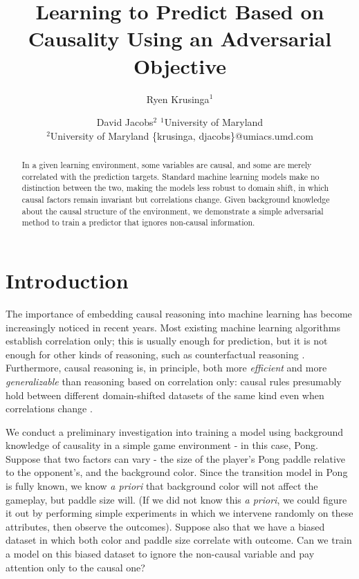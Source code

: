 \documentclass{article}
\title{Learning to Predict Based on Causality Using an Adversarial Objective}
\author{
Ryen Krusinga$^1$
\and
David Jacobs$^2$
\affiliations
$^1$University of Maryland\\
$^2$University of Maryland
\emails
\{krusinga, djacobs\}@umiacs.umd.com
}
\begin{document}
\maketitle

\begin{abstract}
In a given learning environment, some variables are causal, and some are merely correlated with the prediction targets. Standard machine learning models make no distinction between the two, making the models less robust to domain shift, in which causal factors remain invariant but correlations change. Given background knowledge about the causal structure of the environment, we demonstrate a simple adversarial method to train a predictor that ignores non-causal information. %
\end{abstract}


\section{Introduction}
The importance of embedding causal reasoning into machine learning has become increasingly noticed in recent years. Most existing machine learning algorithms establish correlation only; this is usually enough for prediction, but it is not enough for other kinds of reasoning, such as counterfactual reasoning \cite{pearl2018theoretical} \cite{Pearl2009}. Furthermore, causal reasoning is, in principle, both more \emph{efficient} and more \emph{generalizable} than reasoning based on correlation only: causal rules presumably hold between different domain-shifted datasets of the same kind even when correlations change \cite{Bottou2019presentation}. 

We conduct a preliminary investigation into training a model using background knowledge of causality in a simple game environment - in this case, Pong. Suppose that two factors can vary - the size of the player's Pong paddle relative to the opponent's, and the background color. Since the transition model in Pong is fully known, we know \emph{a priori} that background color will not affect the gameplay, but paddle size will. (If we did not know this \emph{a priori}, we could figure it out by performing simple experiments in which we intervene randomly on these attributes, then observe the outcomes). Suppose also that we have a biased dataset in which both color and paddle size correlate with outcome. Can we train a model on this biased dataset to ignore the non-causal variable and pay attention only to the causal one?
\end{document}
